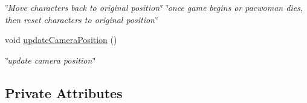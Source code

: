 \begin{DoxyCompactItemize}
\begin{DoxyCompactList}\small\item\em \char`\"{}\+Move characters back to original position\char`\"{}  \char`\"{}once game begins or pacwoman dies, then reset characters to original position\char`\"{} \end{DoxyCompactList}\item 
void \hyperlink{classPlayingState_a9f65954a241c0cc7eed49cc13acbe65c}{update\+Camera\+Position} ()
\begin{DoxyCompactList}\small\item\em \char`\"{}update camera position\char`\"{} \end{DoxyCompactList}\end{DoxyCompactItemize}
\subsection*{Private Attributes}
